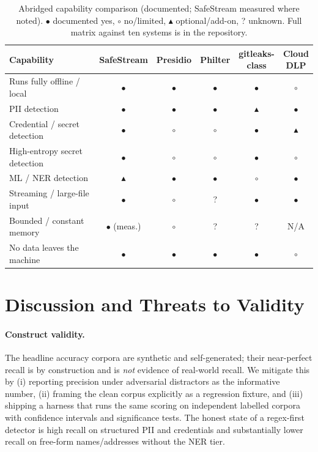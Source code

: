 \documentclass[runningheads]{llncs}
\begin{document}
\begin{table}[t]
\centering
\caption{Abridged capability comparison (documented; SafeStream measured where
noted). $\bullet$ documented yes, $\circ$ no/limited, $\blacktriangle$
optional/add-on, ? unknown. Full matrix against ten systems is in the
repository.}
\label{tab:capability}
\setlength{\tabcolsep}{3.5pt}
\begin{tabular}{@{}lccccc@{}}
\toprule
Capability & SafeStream & Presidio & Philter & \makecell{gitleaks-\\class} & \makecell{Cloud\\DLP} \\
\midrule
Runs fully offline / local      & $\bullet$ & $\bullet$ & $\bullet$ & $\bullet$ & $\circ$ \\
PII detection                   & $\bullet$ & $\bullet$ & $\bullet$ & $\blacktriangle$ & $\bullet$ \\
Credential / secret detection   & $\bullet$ & $\circ$ & $\circ$ & $\bullet$ & $\blacktriangle$ \\
High-entropy secret detection   & $\bullet$ & $\circ$ & $\circ$ & $\bullet$ & $\circ$ \\
ML / NER detection              & $\blacktriangle$ & $\bullet$ & $\bullet$ & $\circ$ & $\bullet$ \\
Streaming / large-file input    & $\bullet$ & $\circ$ & ? & $\bullet$ & $\bullet$ \\
Bounded / constant memory       & $\bullet$ (meas.) & $\circ$ & ? & ? & N/A \\
No data leaves the machine      & $\bullet$ & $\bullet$ & $\bullet$ & $\bullet$ & $\circ$ \\
\bottomrule
\end{tabular}
\end{table}

\section{Discussion and Threats to Validity}
\label{sec:discussion}

\paragraph{Construct validity.}
The headline accuracy corpora are synthetic and self-generated; their
near-perfect recall is by construction and is \emph{not} evidence of real-world
recall. We mitigate this by (i) reporting precision under adversarial distractors
as the informative number, (ii) framing the clean corpus explicitly as a
regression fixture, and (iii) shipping a harness that runs the same scoring on
independent labelled corpora with confidence intervals and significance tests.
The honest state of a regex-first detector is high recall on structured PII and
credentials and substantially lower recall on free-form names/addresses without
the NER tier.
\end{document}
